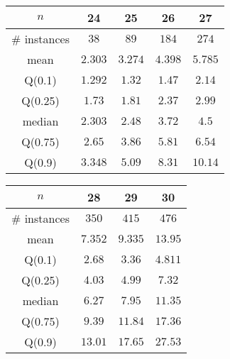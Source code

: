 \begin{tabular}{c|cccc} 
\hline 
$n$ & 24 & 25 & 26 & 27 \tabularnewline 
\hline 
\hline 
\# instances & $38$ & $89$ & $184$ & $274$ \tabularnewline 
mean & $2.303$ & $3.274$ & $4.398$ & $5.785$ \tabularnewline 
Q(0.1) & $1.292$ & $1.32$ & $1.47$ & $2.14$ \tabularnewline 
Q(0.25) & $1.73$ & $1.81$ & $2.37$ & $2.99$ \tabularnewline 
median & $2.303$ & $2.48$ & $3.72$ & $4.5$ \tabularnewline 
Q(0.75) & $2.65$ & $3.86$ & $5.81$ & $6.54$ \tabularnewline 
Q(0.9) & $3.348$ & $5.09$ & $8.31$ & $10.14$ \tabularnewline 
\hline 
\end{tabular} 
\medskip{} 

\begin{tabular}{c|ccc} 
\hline 
$n$ & 28 & 29 & 30 \tabularnewline 
\hline 
\hline 
\# instances & $350$ & $415$ & $476$ \tabularnewline 
mean & $7.352$ & $9.335$ & $13.95$ \tabularnewline 
Q(0.1) & $2.68$ & $3.36$ & $4.811$ \tabularnewline 
Q(0.25) & $4.03$ & $4.99$ & $7.32$ \tabularnewline 
median & $6.27$ & $7.95$ & $11.35$ \tabularnewline 
Q(0.75) & $9.39$ & $11.84$ & $17.36$ \tabularnewline 
Q(0.9) & $13.01$ & $17.65$ & $27.53$ \tabularnewline 
\hline 
\end{tabular} 
\medskip{} 

